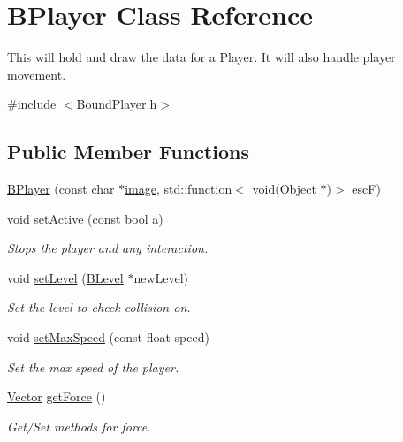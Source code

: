 \hypertarget{class_b_player}{\section{\-B\-Player \-Class \-Reference}
\label{class_b_player}
}


\-This will hold and draw the data for a \-Player. \-It will also handle player movement.  




{\ttfamily \#include $<$\-Bound\-Player.\-h$>$}

\subsection*{\-Public \-Member \-Functions}
\begin{DoxyCompactItemize}
\item 
\hyperlink{class_b_player_ab32977496976aff5421f2af0d277aaf8}{\-B\-Player} (const char $\ast$\hyperlink{_game_list_8h_ac745ab21f82aa96829863dcfc37ef5a8}{image}, std\-::function$<$ void(\-Object $\ast$)$>$ esc\-F)
\item 
void \hyperlink{class_b_player_a2c7606b7353aa365048bcb4e6fe1fadc}{set\-Active} (const bool a)
\begin{DoxyCompactList}\small\item\em \-Stops the player and any interaction. \end{DoxyCompactList}\item 
void \hyperlink{class_b_player_a03add0a9a55d81912897518d94daf52f}{set\-Level} (\hyperlink{class_b_level}{\-B\-Level} $\ast$new\-Level)
\begin{DoxyCompactList}\small\item\em \-Set the level to check collision on. \end{DoxyCompactList}\item 
void \hyperlink{class_b_player_ace0ec1b13a62c932950a86a469d0263f}{set\-Max\-Speed} (const float speed)
\begin{DoxyCompactList}\small\item\em \-Set the max speed of the player. \end{DoxyCompactList}\item 
\hyperlink{struct_vector}{\-Vector} \hyperlink{class_b_player_a33b7d635e3aa3c7a4796eabc4205cc58}{get\-Force} ()
\begin{DoxyCompactList}\small\item\em \-Get/\-Set methods for force. \end{DoxyCompactList}\item 

\end{DoxyCompactItemize}
